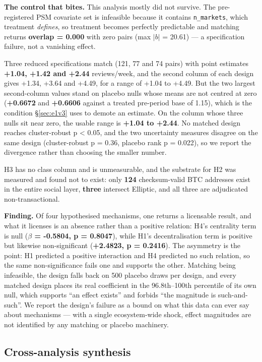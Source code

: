 \textbf{The control that bites.} This analysis mostly did not survive. The
pre-registered PSM covariate set is infeasible because it contains
\texttt{n\_markets}, which treatment \emph{defines}, so treatment becomes
perfectly predictable and matching returns \textbf{overlap = 0.000} with zero
pairs (max $|b|$ = 20.61) --- a specification failure, not a vanishing effect.

Three reduced specifications match (121, 77 and 74 pairs) with point estimates
\textbf{+1.04, +1.42 and +2.44} reviews/week, and the second column of each
design gives +1.34, +3.64 and +4.49, for a range of +1.04 to +4.49. But the two
largest second-column values stand on placebo nulls whose means are not centred
at zero (\textbf{+0.6672} and \textbf{+0.6606} against a treated pre-period base
of 1.15), which is the condition \S\ref{sec:e1v3} uses to demote an estimate. On
the column whose three nulls sit near zero, the usable range is \textbf{+1.04 to
+2.44}. No matched design reaches cluster-robust p \textless{} 0.05, and the two
uncertainty measures disagree on the same design (cluster-robust p = 0.36,
placebo rank p = 0.022), so we report the divergence rather than choosing the
smaller number.

H3 has no class column and is unmeasurable, and the substrate for H2 was measured
and found not to exist: only \textbf{124} checksum-valid BTC addresses exist in
the entire social layer, \textbf{three} intersect Elliptic, and all three are
adjudicated non-transactional.

\textbf{Finding.} Of four hypothesised mechanisms, one returns a licensable
result, and what it licenses is an absence rather than a positive relation:
H4's centrality term is null (\textbf{$\beta$ = -0.5804, p = 0.8047}), while
H1's decentralisation term is positive but likewise non-significant
(\textbf{+2.4823, p = 0.2416}). The asymmetry is the point: H1 predicted a
positive interaction and H4 predicted no such relation, so the same
non-significance fails one and supports the other. Matching being infeasible,
the design falls back on 500 placebo draws per design, and every matched design
places its real coefficient in the 96.8th--100th percentile of its own null,
which supports ``an effect exists'' and forbids ``the magnitude is
such-and-such''. We report the design's failure as a bound on what this data can
ever say about mechanisms --- with a single ecosystem-wide shock, effect
magnitudes are not identified by any matching or placebo machinery.

\subsection{Cross-analysis synthesis}

